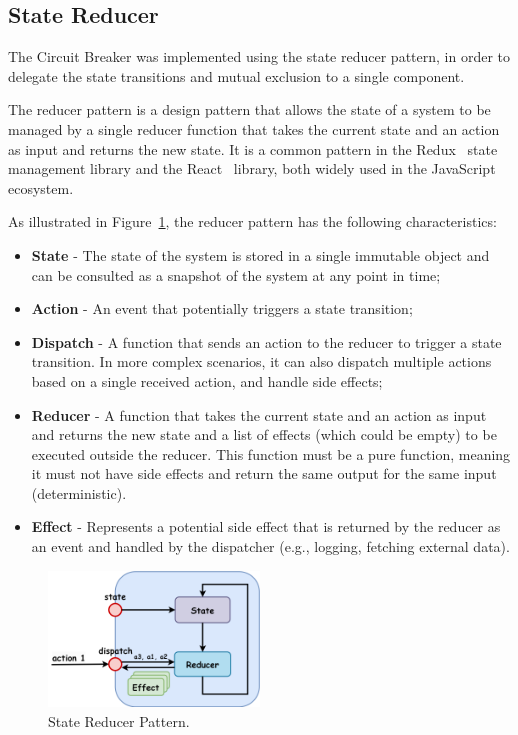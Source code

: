 \subsection{State Reducer}\label{subsec:cbreaker-state-reducer}

The Circuit Breaker was implemented using the state reducer pattern,
in order to delegate the state transitions and mutual exclusion to a single component.

The reducer pattern is a design pattern
that allows the state of a system
to be managed by a single reducer function
that takes the current state and an action as input and returns the new state.
It is a common pattern in the Redux~\cite{redux} state management library and the React~\cite{react-use-reducer} library,
both widely used in the JavaScript ecosystem.

As illustrated in Figure~\ref{fig:reducer-pattern}, the reducer pattern has the following characteristics:

\begin{itemize}
    \item \textbf{State} - The state of the system is stored in a single immutable object and can be consulted as a snapshot of the system at any point in time;
    \item \textbf{Action} - An event that potentially triggers a state transition;
    \item \textbf{Dispatch} - A function that sends an action to the reducer to trigger a state transition.
    In more complex scenarios, it can also dispatch multiple actions based on a single received action, and handle side effects;
    \item \textbf{Reducer} - A function that takes the current state and an action as input and returns the new state and a list of effects (which could be empty) to be executed outside the reducer.
    This function must be a pure function, meaning it must not have side effects and return the same output for the same input (deterministic).
    \item \textbf{Effect} -
    Represents a potential side effect that is returned by the reducer as an event and handled by the dispatcher (e.g., logging, fetching external data).
\end{itemize}

\begin{figure}[!htb]
    \centering
    \includegraphics[width=0.5\textwidth]{../figures/05_reducer-pattern}
    \caption{State Reducer Pattern.}
    \label{fig:reducer-pattern}
\end{figure}

